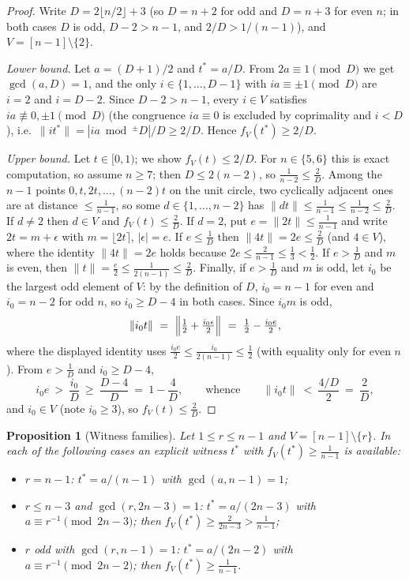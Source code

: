 \documentclass[11pt]{article}
\newtheorem{proposition}[theorem]{Proposition}
\theoremstyle{definition}
\begin{document}
\begin{proof}
Write $D=2\lfloor n/2\rfloor+3$ (so $D=n+2$ for odd and $D=n+3$ for even
$n$; in both cases $D$ is odd, $D-2>n-1$, and $2/D>1/(n-1)$), and
$V=[n-1]\setminus\{2\}$.

\emph{Lower bound.}  Let $a=(D+1)/2$ and $t^*=a/D$.  From
$2a\equiv1\pmod D$ we get $\gcd(a,D)=1$, and the only
$i\in\{1,\dots,D-1\}$ with $ia\equiv\pm1\pmod D$ are $i=2$ and $i=D-2$.
Since $D-2>n-1$, every $i\in V$ satisfies $ia\not\equiv0,\pm1\pmod D$
(the congruence $ia\equiv0$ is excluded by coprimality and $i<D$), i.e.\
$\|it^*\|=|ia\bmod^{\pm}D|/D\ge2/D$.  Hence $f_V(t^*)\ge2/D$.

\emph{Upper bound.}  Let $t\in[0,1)$; we show $f_V(t)\le2/D$.  For
$n\in\{5,6\}$ this is exact computation, so assume $n\ge7$; then
$D\le2(n-2)$, so $\frac1{n-2}\le\frac2D$.  Among the $n-1$ points
$0,t,2t,\dots,(n-2)t$ on the unit circle, two cyclically adjacent ones
are at distance $\le\frac1{n-1}$, so some $d\in\{1,\dots,n-2\}$ has
$\|dt\|\le\frac1{n-1}\le\frac1{n-2}\le\frac2D$.  If $d\ne2$ then $d\in V$
and $f_V(t)\le\frac2D$.  If $d=2$, put $e=\|2t\|\le\frac1{n-1}$ and write
$2t=m+\epsilon$ with $m=\lfloor2t\rceil$, $|\epsilon|=e$.
If $e\le\frac1D$ then $\|4t\|=2e\le\frac2D$ (and $4\in V$), where the
identity $\|4t\|=2e$ holds because $2e\le\frac2{n-1}\le\frac13<\frac12$.
If $e>\frac1D$ and $m$ is even, then $\|t\|=\frac e2
\le\frac1{2(n-1)}\le\frac2D$.  Finally, if $e>\frac1D$ and $m$ is odd, let
$i_0$ be the largest odd element of $V$: by the definition of $D$,
$i_0=n-1$ for even and $i_0=n-2$ for odd $n$, so $i_0\ge D-4$ in both
cases.  Since $i_0m$ is odd,
\[
\|i_0t\|\ =\ \Bigl\|\tfrac12+\tfrac{i_0\epsilon}{2}\Bigr\|
\ =\ \tfrac12-\tfrac{i_0e}{2},
\]
where the displayed identity uses $\frac{i_0e}{2}\le\frac{i_0}{2(n-1)}
\le\frac12$ (with equality only for even $n$).  From $e>\frac1D$ and
$i_0\ge D-4$,
\[
i_0e\ >\ \frac{i_0}{D}\ \ge\ \frac{D-4}{D}\ =\ 1-\frac4D,
\qquad\text{whence}\qquad
\|i_0t\|\ <\ \frac{4/D}{2}\ =\ \frac2D ,
\]
and $i_0\in V$ (note $i_0\ge3$), so $f_V(t)\le\frac2D$.
\end{proof}

\begin{proposition}[Witness families]\label{prop:witness}
Let $1\le r\le n-1$ and $V=[n-1]\setminus\{r\}$.  In each of the
following cases an explicit witness $t^*$ with $f_V(t^*)\ge\frac1{n-1}$
is available:
\begin{itemize}
\item[\emph{(i)}] $r=n-1$: $t^*=a/(n-1)$ with $\gcd(a,n-1)=1$;
\item[\emph{(ii)}] $r\le n-3$ and $\gcd(r,2n-3)=1$: $t^*=a/(2n-3)$ with
  $a\equiv r^{-1}\pmod{2n-3}$; then
  $f_V(t^*)\ge\frac{2}{2n-3}>\frac1{n-1}$;
\item[\emph{(iii)}] $r$ odd with $\gcd(r,n-1)=1$: $t^*=a/(2n-2)$ with
  $a\equiv r^{-1}\pmod{2n-2}$; then $f_V(t^*)\ge\frac{1}{n-1}$.
\end{itemize}
\end{proposition}
\end{document}
